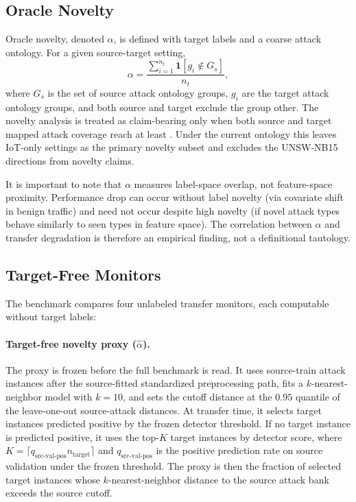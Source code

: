\documentclass[preprint,12pt]{elsarticle}
\begin{document}
\subsection{Oracle Novelty}

Oracle novelty, denoted $\alpha$, is defined with target labels and a coarse attack ontology. For a given source-target setting,
\[
\alpha = \frac{\sum_{i=1}^{n_t}\mathbf{1}[g_i \notin G_s]}{n_t},
\]
where $G_s$ is the set of source attack ontology groups, $g_i$ are the target attack ontology groups, and both source and target exclude the group other. The novelty analysis is treated as claim-bearing only when both source and target mapped attack coverage reach at least \NoveltyCoverageFloor{}. Under the current ontology this leaves \PrimaryIotSettingCount{} IoT-only settings as the primary novelty subset and excludes the UNSW-NB15 directions from novelty claims.

It is important to note that $\alpha$ measures label-space overlap, not feature-space proximity. Performance drop can occur without label novelty (via covariate shift in benign traffic) and need not occur despite high novelty (if novel attack types behave similarly to seen types in feature space). The correlation between $\alpha$ and transfer degradation is therefore an empirical finding, not a definitional tautology.

\subsection{Target-Free Monitors}
\label{sec:monitors}

The benchmark compares four unlabeled transfer monitors, each computable without target labels:

\paragraph{Target-free novelty proxy ($\hat{\alpha}$).} The proxy is frozen before the full benchmark is read. It uses source-train attack instances after the source-fitted standardized preprocessing path, fits a $k$-nearest-neighbor model with $k=10$, and sets the cutoff distance at the $0.95$ quantile of the leave-one-out source-attack distances. At transfer time, it selects target instances predicted positive by the frozen detector threshold. If no target instance is predicted positive, it uses the top-$K$ target instances by detector score, where $K=\lceil q_{\text{src-val-pos}} n_{\text{target}}\rceil$ and $q_{\text{src-val-pos}}$ is the positive prediction rate on source validation under the frozen threshold. The proxy is then the fraction of selected target instances whose $k$-nearest-neighbor distance to the source attack bank exceeds the source cutoff.
\end{document}

